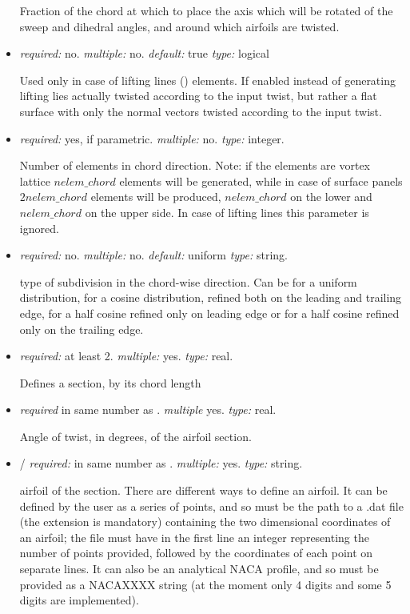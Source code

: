 \begin{itemize}
Fraction of the chord at which to place the axis which will be rotated of the sweep and dihedral angles, and around which airfoils are twisted. 

\item {} \textit{required:} no. \textit{multiple:} no. \textit{default:} true \textit{type:} logical

Used only in case of lifting lines () elements. If enabled instead of generating lifting lies actually twisted according to the input twist, but rather a flat surface with only the normal vectors twisted according to the input twist. 

\item {} \textit{required:} yes, if parametric. \textit{multiple:} no. \textit{type:} integer.

Number of elements in chord direction. Note: if the elements are vortex lattice $nelem\_chord$ elements will be generated, while in case of surface panels $2nelem\_chord$ elements will be produced, $nelem\_chord$ on the lower and $nelem\_chord$ on the upper side. In case of lifting lines this parameter is ignored.

\item {} \textit{required:} no. \textit{multiple:} no. \textit{default:} uniform \textit{type:} string.

type of subdivision in the chord-wise direction. Can be  for a uniform distribution,  for a cosine distribution, refined both on the leading and trailing edge,  for a half cosine refined only on leading edge or  for a half cosine refined only on the trailing edge. 

\item {} \textit{required:} at least 2. \textit{multiple:} yes. \textit{type:} real.

Defines a section, by its chord length

\item {} \textit{required} in same number as . \textit{multiple} yes. \textit{type:} real.

Angle of twist, in degrees, of the airfoil section.

\item {}/ \textit{required:} in same number as . \textit{multiple:} yes. \textit{type:} string.

airfoil of the section. There are different ways to define an airfoil. It can be defined by the user as a series of points, and so  must be the path to a .dat file (the extension is mandatory) containing the two dimensional coordinates of an airfoil; the file must have in the first line an integer representing the number of points provided, followed by the coordinates of each point on separate lines. It can also be an analytical NACA profile, and so must be provided as a NACAXXXX string (at the moment only 4 digits and some 5 digits are implemented). 


\end{itemize}

